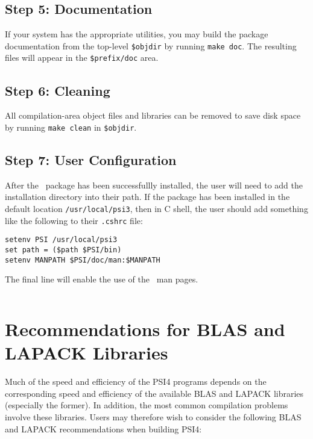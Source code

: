 \documentclass[12pt]{article}
\begin{document}
\subsection{Step 5: Documentation}

If your system has the appropriate utilities, you may build the package
documentation from the top-level {\tt \$objdir} by running {\tt make doc}.  
The resulting files will appear in the {\tt \$prefix/doc} area.

\subsection{Step 6: Cleaning}

All compilation-area object files and libraries can be removed to save
disk space by running {\tt make clean} in {\tt \$objdir}.

\subsection{Step 7: User Configuration}

After the \PSIfour\ package has been successfullly installed, the user will
need to add the installation directory into their path.  If the package
has been installed in the default location {\tt /usr/local/psi3}, then
in C shell, the user should add something like the following to 
their {\tt .cshrc} file:
\begin{verbatim}
setenv PSI /usr/local/psi3
set path = ($path $PSI/bin)
setenv MANPATH $PSI/doc/man:$MANPATH
\end{verbatim}
The final line will enable the use of the \PSIfour\ man pages.
\begin{verbatim}
\end{verbatim}

\section{Recommendations for BLAS and LAPACK Libraries}

Much of the speed and efficiency of the PSI4 programs depends on the
corresponding speed and efficiency of the available BLAS and LAPACK
libraries (especially the former).  In addition, the most common
compilation problems involve these libraries.  Users may therefore
wish to consider the following BLAS and LAPACK recommendations when
building PSI4:
\end{document}
